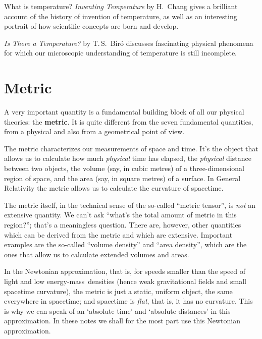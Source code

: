 \documentclass[a4paper,12pt,%
onecolumn,oneside,%
british%
]{memoir}
\renewcommand*{\|}[1][]{\nonscript\:#1\vert\nonscript\:\mathopen{}}
\newcommand*{\energym}{energy-mass}
\begin{document}
\begin{extra}{{What is temperature?}}
\emph{Inventing Temperature} by H.~Chang \parencites*{chang2004} gives a brilliant account of the history of invention of temperature, as well as an interesting portrait of how scientific concepts are born and develop.

\smallskip

\emph{Is There a Temperature?} by T.\,S.~Bir{\'o} \parencites*{biro2011} discusses fascinating physical phenomena for which our microscopic understanding of temperature is still incomplete.%
\end{extra}



\section{Metric}
\label{sec:metric}

A very important quantity is a fundamental building block of all our physical theories: the \textbf{metric}. It is quite different from the seven fundamental quantities, from a physical and also from a geometrical point of view.

The metric characterizes our measurements of space and time. It's the object that allows us to calculate how much \emph{physical} time has elapsed, the \emph{physical} distance between two objects, the volume (say, in cubic metres) of a three-dimensional region of space, and the area (say, in square metres) of a surface. In General Relativity the metric allows us to calculate the curvature of spacetime.

The metric itself, in the technical sense of the so-called \enquote{metric tensor}, is \emph{not} an extensive quantity. We can't ask \enquote{what's the total amount of metric in this region?}; that's a meaningless question. There are, however, other quantities which can be derived from the metric and which are extensive. Important examples are the so-called \enquote{volume density} and \enquote{area density}, which are the ones that allow us to calculate extended volumes and areas.

In the Newtonian approximation, that is, for speeds smaller than the speed of light and low \energym\ densities (hence weak gravitational fields and small spacetime curvature), the metric is just a static, uniform object, the same everywhere in spacetime; and spacetime is \emph{flat}, that is, it has no curvature. This is why we can speak of an \enquote*{absolute time} and \enquote*{absolute distances} in this approximation. In these notes we shall for the most part use this Newtonian approximation.
\end{document}
